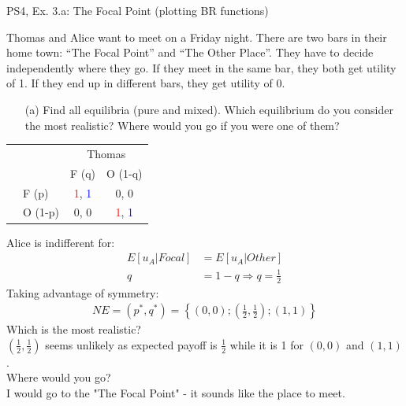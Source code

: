 \begin{frame}{PS4, Ex. 3.a: The Focal Point (plotting BR functions)}
  \begin{multicols}{2}
    Thomas and Alice want to meet on a Friday night. There are two bars in their home town: “The Focal Point” and “The Other Place”. They have to decide independently where they go. If they meet in the same bar, they both get utility of 1. If they end up in different bars, they get utility of 0.
    \begin{itemize}
      \item[(a)] Find all equilibria (pure and mixed). Which equilibrium do you consider the most realistic? Where would you go if you were one of them?
    \end{itemize}
    \begin{table}
      \begin{tabular}{cl|c|c|}
        & \multicolumn{1}{c}{} & \multicolumn{2}{c}{\color{blue}Thomas}\\
        & \multicolumn{1}{c}{} & \multicolumn{1}{c}{F (q)} & \multicolumn{1}{c}{O (1-q)} \\\cline{3-4}
        \parbox[t]{1mm}{}
        & F (p) & \textcolor{red}{1}, \textcolor{blue}{1} & 0, 0 \\
        & O (1-p) & 0, 0 & \textcolor{red}{1}, \textcolor{blue}{1} \\
      \end{tabular}
    \end{table}
  \vfill\null \columnbreak
    Alice is indifferent for:
    \begin{align*}
      E[u_A|Focal]&=E[u_A|Other]\\
      q &= 1-q \Rightarrow q = \frac{1}{2}
    \end{align*}
    Taking advantage of symmetry:
    \begin{align*}
      NE=(p^{*},q^{*})=\left\{(0,0);\left(\frac{1}{2},\frac{1}{2}\right);(1,1)\right\}
    \end{align*}
    Which is the most realistic?\\\medskip
    $(\frac{1}{2},\frac{1}{2})$ seems unlikely as expected payoff is $\frac{1}{2}$ while it is 1 for $(0,0)$ and $(1,1)$.\\\medskip
    Where would you go?\\\medskip
    I would go to the "The Focal Point" - it sounds like the place to meet.
  \vfill\null
  \end{multicols}
\end{frame}
